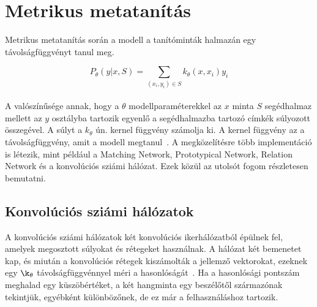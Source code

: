 \section{Metrikus metatanítás}

Metrikus metatanítás során a modell a tanítóminták halmazán egy távolságfüggvényt tanul meg.

\begin{equation} \label{eq:3}
P_{\theta}(y|x, S) = \sum_{(x_i, y_i)\in S} k_{\theta}(x, x_i)y_i
\end{equation}
\ \\
A valószínűsége annak, hogy a $\theta$ modellparaméterekkel az $x$ minta $S$ segédhalmaz mellett az $y$ osztályba tartozik egyenlő a segédhalmazba tartozó címkék súlyozott összegével. A súlyt a $k_{\theta}$ ún. kernel függvény számolja ki. A kernel függvény az a távolságfüggvény, amit a modell megtanul~\cite{meta_learning_summarize}.
\newline
\newline
A megközelítésre több implementáció is létezik, mint például a Matching Network, Prototypical Network, Relation Network és a konvolúciós sziámi hálózat. Ezek közül az utolsót fogom részletesen bemutatni.  

\subsection{Konvolúciós sziámi hálózatok} \label{section:siamese_conv}

A konvolúciós sziámi hálózatok két konvolúciós ikerhálózatból épülnek fel, amelyek megosztott súlyokat és rétegeket használnak. A hálózat két bemenetet kap, és miután a konvolúciós rétegek kiszámolták a jellemző vektorokat, ezeknek egy $\k_{\theta}$ távolságfüggvénnyel méri a hasonlóságát~\cite{siamese}. Ha a hasonlósági pontszám meghalad egy küszöbértéket, a két hangminta egy beszélőtől származónak tekintjük, egyébként különbözőnek, de ez már a felhasználáshoz tartozik.

